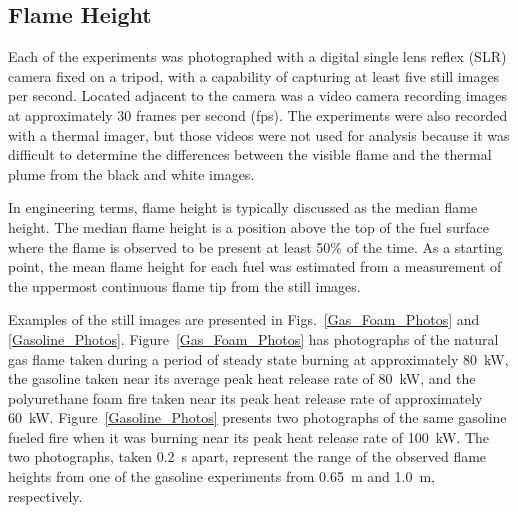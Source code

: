 \documentclass[twoside]{uocthesis}
\begin{document}
{\subsection{Flame Height}

Each of the experiments was photographed with a digital single lens reflex (SLR) camera fixed on a tripod, with a capability of capturing at least five still images per second.  Located adjacent to the camera was a video camera recording images at approximately 30 frames per second (fps).  The experiments were also recorded with a thermal imager, but those videos were not used for analysis because it was difficult to determine the differences between the visible flame and the thermal plume from the black and white images.

In engineering terms, flame height is typically discussed as the median flame height.  The median flame height is a position above the top of the fuel surface where the flame is observed to be present at least 50\% of the time.  As a starting point, the mean flame height for each fuel was estimated from a measurement of the uppermost continuous flame tip from the still images.

Examples of the still images are presented in Figs.~\ref{Gas_Foam_Photos} and \ref{Gasoline_Photos}.  Figure~\ref{Gas_Foam_Photos} has photographs of the natural gas flame taken during a period of steady state burning at approximately 80~kW, the gasoline taken near its average peak heat release rate of 80~kW, and the polyurethane foam fire taken near its peak heat release rate of approximately 60~kW.  Figure~\ref{Gasoline_Photos} presents two photographs of the same gasoline fueled fire when it was burning near its peak heat release rate of 100~kW.  The two photographs, taken 0.2~s apart, represent the range of the observed flame heights from one of the gasoline experiments from 0.65~m and 1.0~m, respectively.  

}
\end{document}
